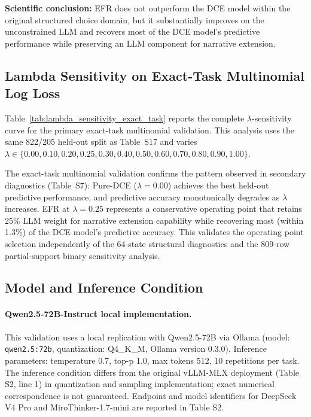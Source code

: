 \documentclass[11pt]{article}
\begin{document}
\textbf{Scientific conclusion:} EFR does not outperform the DCE model within the original structured choice domain, but it substantially improves on the unconstrained LLM and recovers most of the DCE model's predictive performance while preserving an LLM component for narrative extension.

\subsection{Lambda Sensitivity on Exact-Task Multinomial Log Loss}
\label{app:lambda_sensitivity_exact_task}

Table~\ref{tab:lambda_sensitivity_exact_task} reports the complete $\lambda$-sensitivity curve for the primary exact-task multinomial validation. This analysis uses the same 822/205 held-out split as Table~S17 and varies $\lambda \in \{0.00, 0.10, 0.20, 0.25, 0.30, 0.40, 0.50, 0.60, 0.70, 0.80, 0.90, 1.00\}$.



The exact-task multinomial validation confirms the pattern observed in secondary diagnostics (Table~S7): Pure-DCE ($\lambda = 0.00$) achieves the best held-out predictive performance, and predictive accuracy monotonically degrades as $\lambda$ increases. EFR at $\lambda = 0.25$ represents a conservative operating point that retains 25\% LLM weight for narrative extension capability while recovering most (within 1.3\%) of the DCE model's predictive accuracy. This validates the operating point selection independently of the 64-state structural diagnostics and the 809-row partial-support binary sensitivity analysis.

\subsection{Model and Inference Condition}

\paragraph{Qwen2.5-72B-Instruct local implementation.} This validation uses a local replication with Qwen2.5-72B via Ollama (model: \texttt{qwen2.5:72b}, quantization: Q4\_K\_M, Ollama version 0.3.0). Inference parameters: temperature 0.7, top-p 1.0, max tokens 512, 10 repetitions per task. The inference condition differs from the original vLLM-MLX deployment (Table S2, line 1) in quantization and sampling implementation; exact numerical correspondence is not guaranteed. Endpoint and model identifiers for DeepSeek V4 Pro and MiroThinker-1.7-mini are reported in Table S2.
\end{document}
